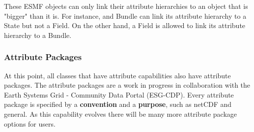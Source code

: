 These ESMF objects can only link their attribute hierarchies to an object that is "bigger" than it is.  For instance, and Bundle can link its attribute hierarchy to a State but not a Field.  On the other hand, a Field is allowed to link its attribute hierarchy to a Bundle.  

\subsubsection{Attribute Packages}

At this point, all classes that have attribute capabilities also have attribute packages.  The attribute packages are a work in progress in collaboration with the Earth Systems Grid - Community Data Portal (ESG-CDP).  Every attribute package is specified by a {\bf convention} and a {\bf purpose}, such as netCDF and general.  As this capability evolves there will be many more attribute package options for users.  



